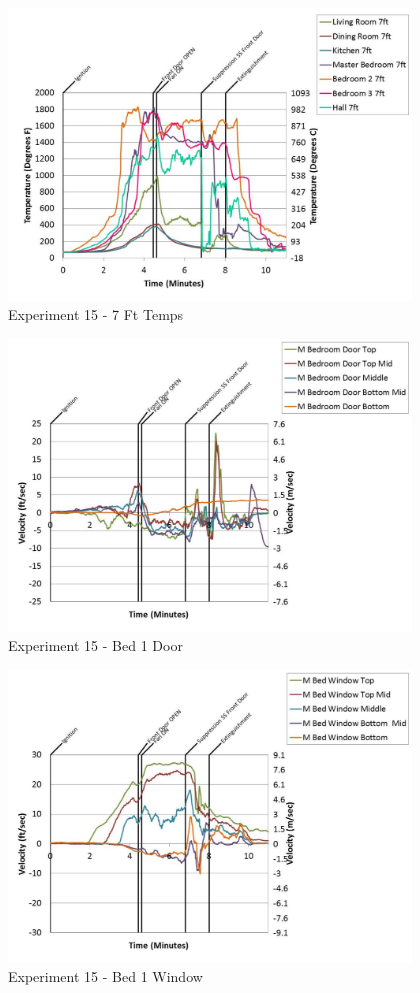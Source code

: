 \documentclass{article}
\begin{document}
\begin{appendices}
	\begin{figure}[h!]
		\centering
		\includegraphics[height=3.05in]{0_Images/Results_Charts/Exp_15_Charts/7FtTemps.pdf}
		\caption{Experiment 15 - 7 Ft Temps}
	\end{figure}
 
	\clearpage

	\begin{figure}[h!]
		\centering
		\includegraphics[height=3.05in]{0_Images/Results_Charts/Exp_15_Charts/Bed1Door.pdf}
		\caption{Experiment 15 - Bed 1 Door}
	\end{figure}
 

	\begin{figure}[h!]
		\centering
		\includegraphics[height=3.05in]{0_Images/Results_Charts/Exp_15_Charts/Bed1Window.pdf}
		\caption{Experiment 15 - Bed 1 Window}
	\end{figure}
 

\end{appendices}
\end{document}
